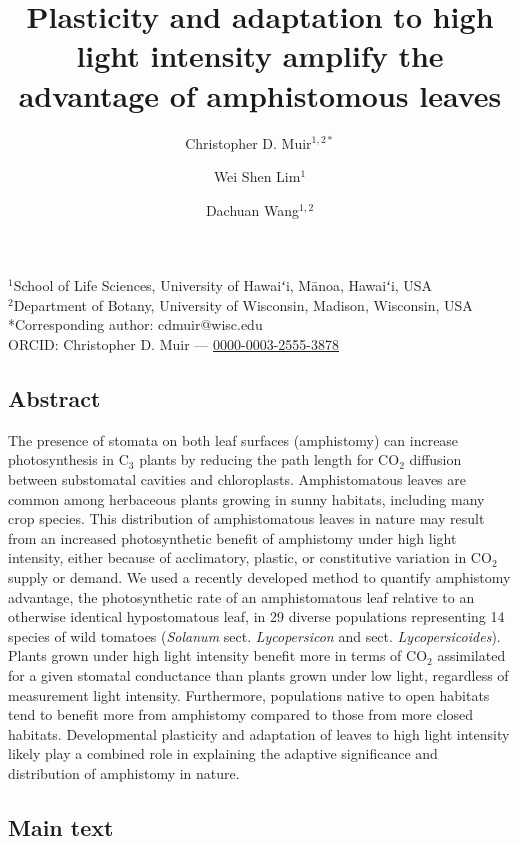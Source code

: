 \documentclass[
  letterpaper,
  DIV=11,
  numbers=noendperiod]{scrartcl}
\title{Plasticity and adaptation to high light intensity amplify the
advantage of amphistomous leaves}
\author{Christopher D. Muir\(^{1,2*}\) \and Wei Shen
Lim\(^{1}\) \and Dachuan Wang\(^{1,2}\)}
\date{}
\begin{document}
\maketitle

\begin{center}
$^1$School of Life Sciences, University of Hawaiʻi, Mānoa, Hawaiʻi, USA\\
$^2$Department of Botany, University of Wisconsin, Madison, Wisconsin, USA\\
\medskip
*Corresponding author: cdmuir@wisc.edu\\
\medskip
ORCID: Christopher D. Muir — \href{https://orcid.org/0000-0003-2555-3878}{0000-0003-2555-3878}\\
\end{center}

\subsection{Abstract}\label{abstract}

The presence of stomata on both leaf surfaces (amphistomy) can increase
photosynthesis in C\(_3\) plants by reducing the path length for
CO\(_2\) diffusion between substomatal cavities and chloroplasts.
Amphistomatous leaves are common among herbaceous plants growing in
sunny habitats, including many crop species. This distribution of
amphistomatous leaves in nature may result from an increased
photosynthetic benefit of amphistomy under high light intensity, either
because of acclimatory, plastic, or constitutive variation in CO\(_2\)
supply or demand. We used a recently developed method to quantify
amphistomy advantage, the photosynthetic rate of an amphistomatous leaf
relative to an otherwise identical hypostomatous leaf, in 29 diverse
populations representing 14 species of wild tomatoes (\emph{Solanum}
sect. \emph{Lycopersicon} and sect. \emph{Lycopersicoides}). Plants
grown under high light intensity benefit more in terms of CO\(_2\)
assimilated for a given stomatal conductance than plants grown under low
light, regardless of measurement light intensity. Furthermore,
populations native to open habitats tend to benefit more from amphistomy
compared to those from more closed habitats. Developmental plasticity
and adaptation of leaves to high light intensity likely play a combined
role in explaining the adaptive significance and distribution of
amphistomy in nature.

\subsection{Main text}\label{main-text}
\end{document}
